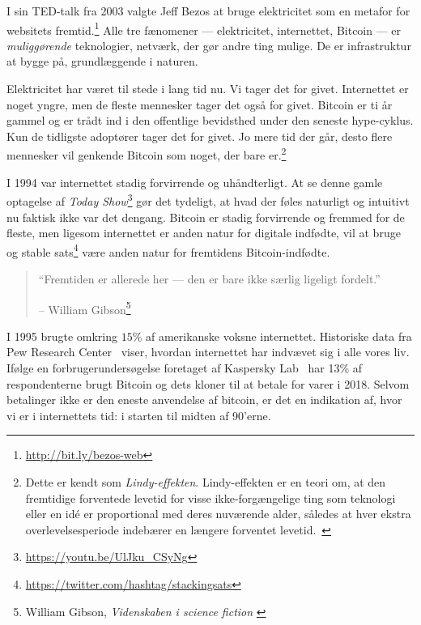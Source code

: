I sin TED-talk fra 2003 valgte Jeff Bezos at bruge elektricitet som en metafor
for websitets fremtid.\footnote{\url{http://bit.ly/bezos-web}} Alle tre fænomener ---
elektricitet, internettet, Bitcoin --- er \textit{muliggørende} teknologier,
netværk, der gør andre ting mulige. De er infrastruktur at bygge på,
grundlæggende i naturen.

Elektricitet har været til stede i lang tid nu. Vi tager det for givet. Internettet er noget yngre, men de fleste mennesker tager det også for givet. Bitcoin er ti år gammel og er trådt ind i den offentlige bevidsthed under den seneste hype-cyklus. Kun de tidligste adoptører tager det for givet. Jo mere tid der går, desto flere mennesker vil genkende Bitcoin som noget, der bare er.\footnote{Dette er kendt som \textit{Lindy-effekten}. Lindy-effekten er en teori om, at den fremtidige forventede levetid for visse ikke-forgængelige ting som teknologi eller en idé er proportional med deres nuværende alder, således at hver ekstra overlevelsesperiode indebærer en længere forventet levetid.~\cite{wiki:lindy}}

I 1994 var internettet stadig forvirrende og uhåndterligt. At se denne gamle optagelse af \textit{Today Show}\footnote{\url{https://youtu.be/UlJku_CSyNg}} gør det tydeligt, at hvad der føles naturligt og intuitivt nu faktisk ikke var det dengang. Bitcoin er stadig forvirrende og fremmed for de fleste, men ligesom internettet er anden natur for digitale indfødte, vil at bruge og stable sats\footnote{\url{https://twitter.com/hashtag/stackingsats}} være anden natur for fremtidens Bitcoin-indfødte.

\begin{quotation}\begin{samepage}
\enquote{Fremtiden er allerede her --- den er bare ikke særlig ligeligt fordelt.}
\begin{flushright} -- William Gibson\footnote{William Gibson, \textit{Videnskaben i science fiction} \cite{william-gibson}}
\end{flushright}\end{samepage}\end{quotation}

I 1995 brugte omkring $15\%$ af amerikanske voksne internettet. Historiske data fra Pew Research Center~\cite{pew-research} viser, hvordan internettet har indvævet sig i alle vores liv. Ifølge en forbrugerundersøgelse foretaget af Kaspersky Lab~\cite{web:kaspersky} har 13\% af respondenterne brugt Bitcoin og dets kloner til at betale for varer i 2018. Selvom betalinger ikke er den eneste anvendelse af bitcoin, er det en indikation af, hvor vi er i internettets tid: i starten til midten af 90'erne.

